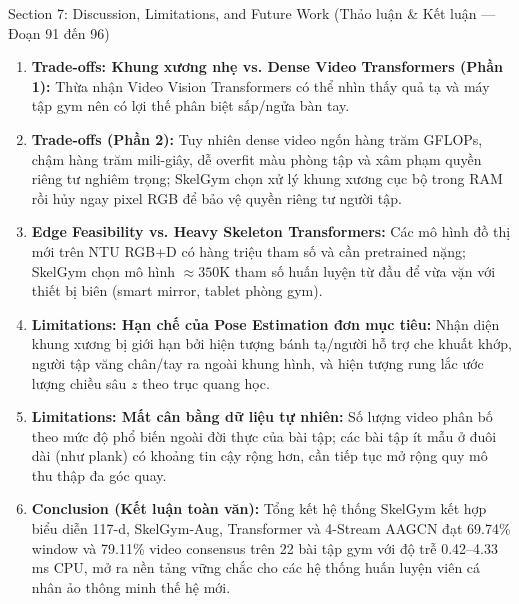 \documentclass[10pt,a4paper]{article}
\begin{document}
\begin{secbox}{Section 7: Discussion, Limitations, and Future Work (Thảo luận \& Kết luận — Đoạn 91 đến 96)}
\begin{enumerate}[leftmargin=*, itemsep=2pt, topsep=1pt, start=91]
    \item \textbf{Trade-offs: Khung xương nhẹ vs. Dense Video Transformers (Phần 1):} Thừa nhận Video Vision Transformers có thể nhìn thấy quả tạ và máy tập gym nên có lợi thế phân biệt sấp/ngửa bàn tay.
    \item \textbf{Trade-offs (Phần 2):} Tuy nhiên dense video ngốn hàng trăm GFLOPs, chậm hàng trăm mili-giây, dễ overfit màu phòng tập và xâm phạm quyền riêng tư nghiêm trọng; SkelGym chọn xử lý khung xương cục bộ trong RAM rồi hủy ngay pixel RGB để bảo vệ quyền riêng tư người tập.
    \item \textbf{Edge Feasibility vs. Heavy Skeleton Transformers:} Các mô hình đồ thị mới trên NTU RGB+D có hàng triệu tham số và cần pretrained nặng; SkelGym chọn mô hình $\approx 350\text{K}$ tham số huấn luyện từ đầu để vừa vặn với thiết bị biên (smart mirror, tablet phòng gym).
    \item \textbf{Limitations: Hạn chế của Pose Estimation đơn mục tiêu:} Nhận diện khung xương bị giới hạn bởi hiện tượng bánh tạ/người hỗ trợ che khuất khớp, người tập văng chân/tay ra ngoài khung hình, và hiện tượng rung lắc ước lượng chiều sâu $z$ theo trục quang học.
    \item \textbf{Limitations: Mất cân bằng dữ liệu tự nhiên:} Số lượng video phân bố theo mức độ phổ biến ngoài đời thực của bài tập; các bài tập ít mẫu ở đuôi dài (như plank) có khoảng tin cậy rộng hơn, cần tiếp tục mở rộng quy mô thu thập đa góc quay.
    \item \textbf{Conclusion (Kết luận toàn văn):} Tổng kết hệ thống SkelGym kết hợp biểu diễn 117-d, SkelGym-Aug, Transformer và 4-Stream AAGCN đạt 69.74\% window và 79.11\% video consensus trên 22 bài tập gym với độ trễ 0.42--4.33 ms CPU, mở ra nền tảng vững chắc cho các hệ thống huấn luyện viên cá nhân ảo thông minh thế hệ mới.
\end{enumerate}
\end{secbox}
\end{document}
